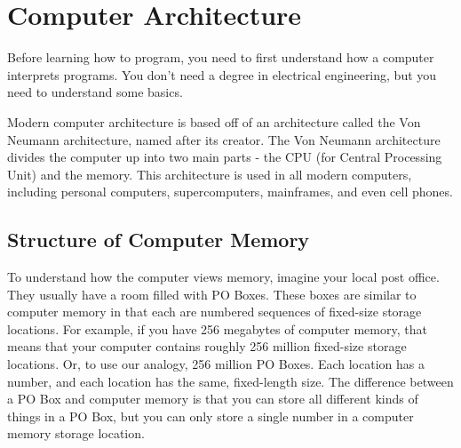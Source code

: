 \chapter{Computer Architecture}
\label{computerarchitecture}

Before learning how to program, you need to first understand how a
computer interprets programs.  You don't need a degree in electrical
engineering, but you need to understand some basics.

Modern computer architecture is based off of an architecture called
the Von Neumann architecture, named after its creator.  The Von
Neumann architecture divides the computer up into two main parts -
the CPU (for Central Processing Unit) and the memory.  This architecture is used in all modern computers, 
including personal computers, supercomputers, mainframes, and even cell phones.

\section{Structure of Computer Memory}

To understand how the computer views memory, imagine your local post 
office.  They usually have a room filled with PO Boxes.  These boxes
are similar to computer memory in that each are numbered sequences
of fixed-size storage locations.  For example, if you have 256 megabytes
of computer memory, that means that your computer contains roughly
256 million fixed-size storage locations.  Or, to use our analogy,
256 million PO Boxes.  Each location has a number, and each location
has the same, fixed-length size.  The difference between a PO Box
and computer memory is that you can store all different kinds of 
things in a PO Box, but you can only store a single number in 
a computer memory storage location.

